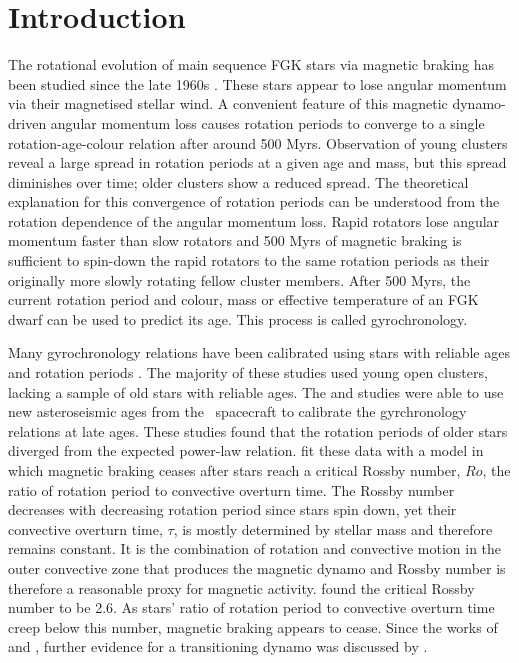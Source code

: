 \newcommand{\nastero}{40}

\section{Introduction}

The rotational evolution of main sequence FGK stars via magnetic braking has
been studied since the late 1960s \citep[\eg][]{Weber, Skumanich}.
These stars appear to lose angular momentum via their magnetised stellar wind.
A convenient feature of this magnetic dynamo-driven angular momentum loss
causes rotation periods to converge to a single rotation-age-colour relation
after around 500 Myrs.
Observation of young clusters reveal a large spread in rotation periods at a
given age and mass, but this spread diminishes over time; older clusters show
a reduced spread.
The theoretical explanation for this convergence of rotation periods can be
understood from the rotation dependence of the angular momentum loss.
Rapid rotators lose angular momentum faster than slow rotators and 500 Myrs of
magnetic braking is sufficient to spin-down the rapid rotators to the same
rotation periods as their originally more slowly rotating fellow cluster
members.
After 500 Myrs, the current rotation period and colour, mass or effective
temperature of an FGK dwarf can be used to predict its age.
This process is called gyrochronology.

Many gyrochronology relations have been calibrated using stars with reliable
ages and rotation periods \citep[\eg][]{Barnes2007, Mamajek2008, Meibom2010,
Angus2015, Vansaders2016}.
The majority of these studies used young open clusters, lacking a sample of
old stars with reliable ages.
The \citet{Angus2015} and \citet{Vansaders2016} studies were able to use new
asteroseismic ages from the \kepler\ spacecraft to calibrate the gyrchronology
relations at late ages.
These studies found that the rotation periods of older stars diverged from the
expected power-law relation.
\citet{Vansaders2016} fit these data with a model in which magnetic braking
ceases after stars reach a critical Rossby number, $Ro$, the ratio of rotation
period to convective overturn time.
The Rossby number decreases with decreasing rotation period since stars spin
down, yet their convective overturn time, $\tau$, is mostly determined by
stellar mass and therefore remains constant.
It is the combination of rotation and convective motion in the outer
convective zone that produces the magnetic dynamo and Rossby number is
therefore a reasonable proxy for magnetic activity.
\citet{Vansaders2016} found the critical Rossby number to be 2.6.
As stars' ratio of rotation period to convective overturn time creep below
this number, magnetic braking appears to cease.
Since the works of \citet{Angus2015} and \citet{Vansaders2016}, further
evidence for a transitioning dynamo was discussed by \citet{...}.

